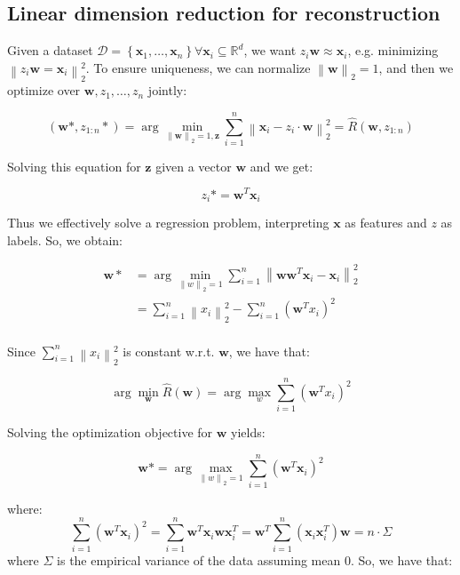\documentclass[a4paper,10pt,twoside]{article}
\newcommand\norm[1]{\left\lVert#1\right\rVert}
\begin{document}
\subsection{Linear dimension reduction for reconstruction}

Given a dataset $\mathcal{D}=\left\{\mathbf{x}_1,\ldots, \mathbf{x}_n\right\}\forall\mathbf{x}_i\subseteq\mathbb{R}^{d}$, we want $z_i\mathbf{w}\approx\mathbf{x}_i$, e.g. minimizing $\norm{z_i\mathbf{w}=\mathbf{x}_i}_2^2$. To ensure uniqueness, we can normalize $\norm{\mathbf{w}}_2=1$, and then we optimize over $\mathbf{w}, z_1, \ldots, z_n$ jointly:

\begin{equation*}
    (\mathbf{w}*,z_{1:n}*) = \arg\min_{\norm{\mathbf{w}}_2 = 1, \mathbf{z}}\sum_{i=1}^{n}\norm{\mathbf{x}_i-z_i\cdot\mathbf{w}}_2^2 = \hat{R}(\mathbf{w}, z_{1:n})
\end{equation*}

Solving this equation for $\mathbf{z}$ given a vector $\mathbf{w}$ and we get:

\begin{equation*}
    z_i*=\mathbf{w}^T\mathbf{x}_i
\end{equation*}

Thus we effectively solve a regression problem, interpreting $\mathbf{x}$ as features and $z$ as labels. So, we obtain:

\begin{align*}
    \mathbf{w}*&=\arg\min_{\norm{w}_2=1}\sum_{i=1}^{n}\norm{\mathbf{w}\mathbf{w}^T\mathbf{x}_i-\mathbf{x}_i}_2^2\\
    &= \sum_{i=1}^{n}\norm{x_i}_2^2-\sum_{i=1}^{n}(\mathbf{w}^Tx_i)^2\\
\end{align*}

Since $\sum_{i=1}^{n}\norm{x_i}_2^2$ is constant w.r.t. $\mathbf{w}$, we have that:

\begin{equation*}
    \arg\min_{\mathbf{w}}\hat{R}(\mathbf{w})=\arg\max_{w}\sum_{i=1}^{n}\left(\mathbf{w}^Tx_i\right)^2
\end{equation*}

Solving the optimization objective for $\mathbf{w}$ yields:

\begin{equation*}
    \mathbf{w}* = \arg\max_{\norm{w}_2=1}\sum_{i=1}^{n}(\mathbf{w}^T\mathbf{x}_i)^2
\end{equation*}

where:
\begin{equation*}
    \sum_{i=1}^{n}(\mathbf{w}^T\mathbf{x}_i)^2 = \sum_{i=1}^{n}\mathbf{w}^T\mathbf{x}_i\mathbf{w}\mathbf{x}_i^T = \mathbf{w}^T\sum_{i=1}^{n}(\mathbf{x}_i\mathbf{x}_i^T)\mathbf{w}=n\cdot\Sigma
\end{equation*}
where $\Sigma$ is the empirical variance of the data assuming mean 0. So, we have that:
\end{document}
